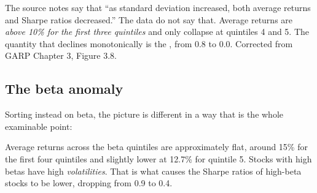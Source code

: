 \begin{imtrapbox}[breakable=false,title={What declines, and what does not}]
The source notes say that ``as standard deviation increased, both average returns
and Sharpe ratios decreased.'' The data do not say that. Average returns are
\emph{above 10\% for the first three quintiles} and only collapse at quintiles 4
and 5. The quantity that declines monotonically is the , from
0.8 to 0.0. Corrected from GARP Chapter 3, Figure 3.8.
\end{imtrapbox}

\subsection{The beta anomaly}

Sorting instead on beta, the picture is different in a way that is the whole
examinable point:

\begin{imkeybox}
 Average returns across the beta quintiles are approximately flat,
around 15\% for the first four quintiles and slightly lower at 12.7\% for
quintile 5. Stocks with high betas have high \emph{volatilities}. That is what
causes the Sharpe ratios of high-beta stocks to be lower, dropping from 0.9 to
0.4.
\end{imkeybox}

